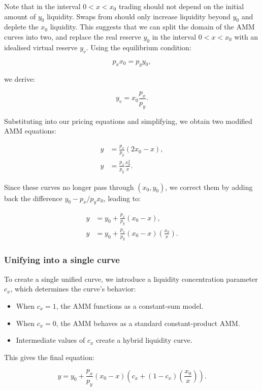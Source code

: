 \documentclass{article}
\begin{document}
Note that in the interval $0 < x < x_0$ trading should not depend on the initial amount of $y_0$ liquidity. Swaps from should only increase liquidity beyond $y_0$ and deplete the $x_0$ liquidity. This suggests that we can split the domain of the AMM curves into two, and replace the real reserve $y_0$ in the interval $0 < x < x_0$ with an idealised virtual reserve $y_v$. Using the equilibrium condition:

\[
p_x x_0 = p_y y_0,
\]

we derive:

\[
y_v = x_0 \frac{p_x}{p_y}.
\]

Substituting into our pricing equations and simplifying, we obtain two modified AMM equations:

\begin{align}
    y &= \frac{p_x}{p_y} (2x_0 - x), \\
    y &= \frac{p_x}{p_y} \frac{x_0^2}{x}.
\end{align}

Since these curves no longer pass through \( (x_0, y_0) \), we correct them by adding back the difference \( y_0 - p_x / p_y x_0 \), leading to:

\begin{align}
    y &= y_0 + \frac{p_x}{p_y} (x_0 - x), \\
    y &= y_0 + \frac{p_x}{p_y} (x_0 - x) \left( \frac{x_0}{x} \right).
\end{align}

\subsubsection{Unifying into a single curve}

To create a single unified curve, we introduce a liquidity concentration parameter \( c_x \), which determines the curve’s behavior:

\begin{itemize}
    \item When \( c_x = 1 \), the AMM functions as a constant-sum model.
    \item When \( c_x = 0 \), the AMM behaves as a standard constant-product AMM.
    \item Intermediate values of \( c_x \) create a hybrid liquidity curve.
\end{itemize}

This gives the final equation:

\begin{equation}
    \label{eq:EulerSwap-1}
    y = y_0 + \frac{p_x}{p_y} (x_0 - x) \left( c_x + (1 - c_x) \left(\frac{x_0}{x}\right) \right).
\end{equation}
\end{document}
